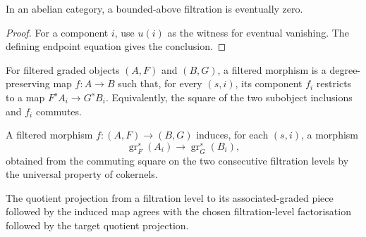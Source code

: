 \begin{lemma}
  \leanok
  \label{lem:core-bounded-above-eventually-zero}
  In an abelian category, a bounded-above filtration is eventually zero.
\end{lemma}

\begin{proof}
  \leanok
  For a component $i$, use $u(i)$ as the witness for eventual vanishing.  The
  defining endpoint equation gives the conclusion.
\end{proof}

\begin{definition}
  \leanok
  \label{def:core-filtered-morphism}
  For filtered graded objects $(A,F)$ and $(B,G)$, a filtered morphism is a
  degree-preserving map $f:A\to B$ such that, for every $(s,i)$, its component
  $f_i$ restricts to a map $F^sA_i\to G^sB_i$.  Equivalently, the square of
  the two subobject inclusions and $f_i$ commutes.
\end{definition}

\begin{definition}
  \leanok
  \label{def:core-associated-graded-map}
  A filtered morphism $f:(A,F)\to(B,G)$ induces, for each $(s,i)$, a morphism
  \[
    \operatorname{gr}^s_F(A_i)\longrightarrow
    \operatorname{gr}^s_G(B_i),
  \]
  obtained from the commuting square on the two consecutive filtration levels
  by the universal property of cokernels.
\end{definition}

\begin{lemma}
  \leanok
  \label{lem:core-associated-graded-map-projection}
  The quotient projection from a filtration level to its associated-graded
  piece followed by the induced map agrees with the chosen filtration-level
  factorisation followed by the target quotient projection.
\end{lemma}

